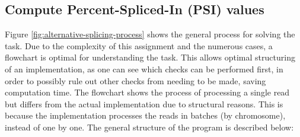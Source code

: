 \documentclass{article}
\begin{document}
    \subsection{Compute Percent-Spliced-In (PSI) values}\label{subsec:compute-percent-spliced-in-(psi)-values-materials-and-methods}
    Figure \ref{fig:alternative-splicing-process} shows the general process for solving the task. Due to the complexity of this assignment and the numerous cases, a flowchart is optimal for understanding the task. This allows optimal structuring of an implementation, as one can see which checks can be performed first, in order to possibly rule out other checks from needing to be made, saving computation time. The flowchart shows the process of processing a single read but differs from the actual implementation due to structural reasons. This is because the implementation processes the reads in batches (by chromosome), instead of one by one. The general structure of the program is described below:
\end{document}
